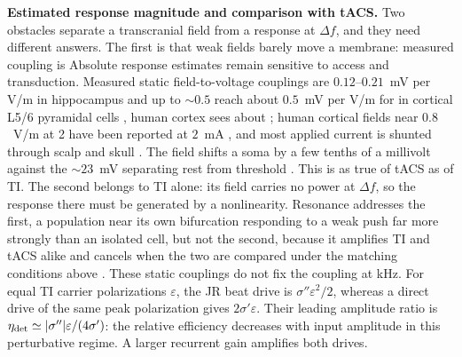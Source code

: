 \documentclass[11pt,a4paper]{article}
\newcommand{\Sig}{\sigma}
\providecommand{\DIFaddtex}[1]{{\protect\color{blue} \sf #1}} %
\providecommand{\DIFdeltex}[1]{{\protect\color{red} \scriptsize #1}} %
\providecommand{\DIFaddbegin}{} %
\providecommand{\DIFaddend}{} %
\providecommand{\DIFdelbegin}{} %
\providecommand{\DIFdelend}{} %
\providecommand{\DIFadd}[1]{\texorpdfstring{\DIFaddtex{#1}}{#1}} %
\providecommand{\DIFdel}[1]{\texorpdfstring{\DIFdeltex{#1}}{}} %
\begin{document}
\DIFdelbegin \DIFdel{\textbf{Estimated response magnitude and comparison with tACS.} Two obstacles separate a
transcranial field from a response at $\Delta f$, and they need different answers.
The first is that weak fields barely move a membrane: measured coupling is
}\DIFdelend \DIFaddbegin \DIFadd{Absolute response estimates remain sensitive to access and transduction.
Measured static field-to-voltage couplings are }\DIFaddend $0.12$--$0.21$~mV per V/m in
hippocampus \cite{bikson2004,deans2007} and \DIFdelbegin \DIFdel{up to
$\sim 0.5$}\DIFdelend \DIFaddbegin \DIFadd{reach about $0.5$}\DIFaddend ~mV per V/m \DIFdelbegin \DIFdel{for }\DIFdelend \DIFaddbegin \DIFadd{in }\DIFaddend cortical
L5/6 pyramidal cells \cite{radman2009}\DIFdelbegin \DIFdel{, human cortex
sees about }\DIFdelend \DIFaddbegin \DIFadd{; human cortical fields near }\DIFaddend $0.8$~V/m \DIFdelbegin \DIFdel{at 2}\DIFdelend \DIFaddbegin \DIFadd{have
been reported at $2$}\DIFaddend ~mA \cite{huang2017,huang2017corr}\DIFdelbegin \DIFdel{, and most applied current is shunted through scalp and skull \cite{voroslakos2018}. The field shifts a soma by a few
tenths of a millivolt against the $\sim 23$~mV separating rest from threshold
\cite{koga2010}. This is
as true of tACS as of TI. The second belongs to TI alone: its field carries no
power at $\Delta f$, so the response there must be generated by a nonlinearity. Resonance
addresses the first, a population near its own bifurcation responding to a weak push far
more strongly than an isolated cell, but not the second, because it amplifies TI and tACS
alike and cancels when the two are compared under the matching conditions above}\DIFdelend \DIFaddbegin \DIFadd{. These static couplings do
not fix the coupling at kHz. For equal TI carrier polarizations $\varepsilon$,
the JR beat drive is $\Sig''\varepsilon^2/2$, whereas a direct drive of the same
peak polarization gives $2\Sig'\varepsilon$. Their leading amplitude ratio is
$\eta_{\rm det}\simeq|\Sig''|\varepsilon/(4\Sig')$: the relative efficiency decreases
with input amplitude in this perturbative regime. A larger recurrent gain
amplifies both drives}\DIFaddend .
\end{document}
